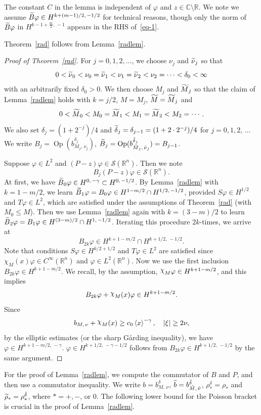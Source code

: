 \documentclass[AHL,Unicode,longabstracts,published]{cedram}
\renewcommand*\c{\gamma}
\renewcommand*\d{\delta}
\newcommand*\f{\varphi}
\renewcommand*\i{\mbox{\raisebox{.5ex}{$\chi$}}}
\newcommand*\n{\nu}
\newcommand*\x{\xi}
\DeclareMathOperator{\Op}{Op}
\newcommand*\re{\mathbb{R}}
\newcommand*\co{\mathbb{C}}
\newcommand{\clS}{\mathcal{S}}
\newcommand{\jap}[1]{\left\langle #1 \right\rangle}
\let\oldtilde\tilde
\renewcommand*{\tilde}[1]{\mathchoice{\widetilde{#1}}{\widetilde{#1}}{\oldtilde{#1}}{\oldtilde{#1}}}
\begin{document}
\begin{rema}
The constant $C$ in the lemma is independent of $\f$ and $z\in\co\setminus\re$. We note we assume $\tilde B\f\in H^{k+(m-1)/2,\,-1/2}$ for technical reasons, though only the norm of $\tilde B\f$ in $H^{k-1+\frac{m}{2},\,-1}$ appears in the RHS of~\eqref{eq-1}.
\end{rema}

Theorem~\ref{rad} follows from Lemma~\ref{radlem}.

\begin{proof}[Proof of Theorem~\ref{rad}]
For $j=0,1,2,\dots$, we choose $\n_{j}$ and $\tilde\n_{j}$ so that
\[
0<\tilde\n_0<\n_0=\tilde\n_{1} <\n_{1}=\tilde\n_2<\n_2=\cdots <\d_0<\infty
\]
with an arbitrarily fixed $\d_0>0$. We then choose $M_{j}$ and $\tilde M_{j}$ so that the claim of Lemma~\ref{radlem} holds with $k=j/2$, $M=M_{j}$, $\tilde M=\tilde M_{j}$ and
\[
0<\tilde M_0<M_0=\tilde M_{1}< M_{1}=\tilde M_2<M_2=\cdots.
\]
We also set $\d_j =(1+2^{-j})/4$ and $\tilde \d_j = \d_{j-1} =(1+2\cdot2^{-j})/4$ for $j=0, 1,2,\,\dots$ We write $B_j=\Op(b^{\d_j}_{M_{j},\,\n_{j}})$, $\tilde B_j=\Op(b^{\tilde\d_j}_{\tilde M_{j},\,\tilde\n_{j}})=B_{j-1}$.

Suppose $\f\in L^2$ and $(P-z)\f\in \clS(\re^n)$. Then we note
\[
B_j(P-z)\f\in \clS(\re^n).
\]
At first, we have $\tilde B_0\f\in H^{0,\,-\c}\subset H^{0,\,-1/2}$. By Lemma~\ref{radlem} with $k=1-m/2$, we learn $\tilde B_{1}\f=B_0\f \in H^{1-m/2}\cap H^{1/2,\,-1/2}$, provided $S\f\in H^{1/2}$ and $T\f\in L^2$, which are satisfied under the assumptions of Theorem~\ref{rad} (with $M_0\leq M$). Then we use Lemma~\ref{radlem} again with $k=(3-m)/2$ to learn $\tilde B_2\f=B_1\f\in H^{(3-m)/2}\cap H^{1,\,-1/2}$. Iterating this procedure $2k$-times, we arrive at
\[
B_{2k}\f\in H^{k+1-m/2}\cap H^{k+1/2,\,-1/2}.
\]
Note that conditions $S\f\in H^{k/2+1/2}$ and $T\f\in L^2$ are satisfied since $\chi_M(x)\f\in C^{\infty}(\re^n)$ and $\f\in L^2(\re^n)$. Now we use the first inclusion $B_{2k}\f\in H^{k+1-m/2}$. We recall, by the assumption, $\i_{M}\f\in H^{k+1-m/2}$, and this implies
\[
B_{2k}\f+\i_M(x)\f \in H^{k+1-m/2}.
\]
Since
\[
b_{M,\,\n}+\i_{M}(x) \geq c_0\jap{x}^{-\c}, \quad |\x|\geq 2\n,
\]
by the elliptic estimates (or the sharp G{\aa}rding inequality), we have $\f\in H^{k+1-m/2,\,-\c}$. $\f\in H^{k+1/2,\,-\c-1/2}$ follows from $B_{2k}\f\in H^{k+1/2,\,-1/2}$ by the same argument.
\end{proof}

For the proof of Lemma~\ref{radlem}, we compute the commutator of $B$ and $P$, and then use a commutator inequality. We write $b=b^\d_{M,\,\n}$, $\tilde b = b^{\tilde\d}_{\tilde M,\,\tilde\n}$, $\rho^\d_*=\rho_*$ and $\tilde\rho_*=\rho^{\tilde\d}_*$, where $*=+,-$, or $0$. The following lower bound for the Poisson bracket is crucial in the proof of Lemma~\ref{radlem}.
\end{document}

